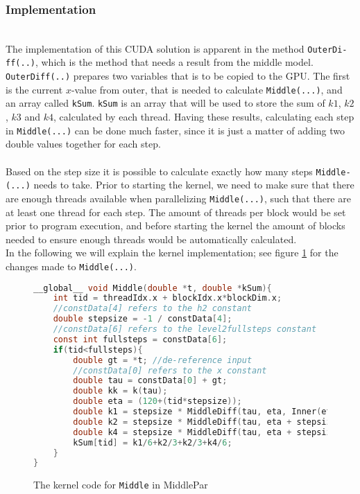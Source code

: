 \subsubsection{Implementation} \hfill\\
The implementation of this CUDA solution is apparent in the method \texttt{OuterDi-\\ff(..)}, which is the method that needs a result from the middle model. \texttt{OuterDiff(..)} prepares two variables that is to be copied to the GPU. The first is the current $x$-value from outer, that is needed to calculate \texttt{Middle(...)}, and an array called \texttt{kSum}. \texttt{kSum} is an array that will be used to store the sum of $k1$, $k2$, $k3$ and $k4$, calculated by each thread. Having these results, calculating each step in \texttt{Middle(...)} can be done much faster, since it is just a matter of adding two double values together for each step. \\ \\
Based on the step size it is possible to calculate exactly how many steps \texttt{Middle-\\(...)} needs to take. Prior to starting the kernel, we need to make sure that there are enough threads available when parallelizing \texttt{Middle(...)}, such that there are at least one thread for each step. The amount of threads per block would be set prior to program execution, and before starting the kernel the amount of blocks needed to ensure enough threads would be automatically calculated.\\

In the following we will explain the kernel implementation; see figure \ref{fig:middlepar} for the changes made to \texttt{Middle(...)}. \\
\begin{figure}[H]
\begin{lstlisting}[language=c]
__global__ void Middle(double *t, double *kSum){
	int tid = threadIdx.x + blockIdx.x*blockDim.x;
	//constData[4] refers to the h2 constant
	double stepsize = -1 / constData[4]; 
	//constData[6] refers to the level2fullsteps constant
	const int fullsteps = constData[6]; 
	if(tid<fullsteps){
		double gt = *t; //de-reference input
		//constData[0] refers to the x constant
		double tau = constData[0] + gt; 
		double kk = k(tau);
		double eta = (120+(tid*stepsize));
		double k1 = stepsize * MiddleDiff(tau, eta, Inner(eta, gt, kk).y);
		double k2 = stepsize * MiddleDiff(tau, eta + stepsize/2, Inner(eta + stepsize/2, gt, kk).y);		
		double k4 = stepsize * MiddleDiff(tau, eta + stepsize, Inner(eta + stepsize, gt, kk).y);
		kSum[tid] = k1/6+k2/3+k2/3+k4/6;
	}
}
\end{lstlisting}
\caption{The kernel code for \texttt{Middle} in MiddlePar}
\label{fig:middlepar}
\end{figure}

